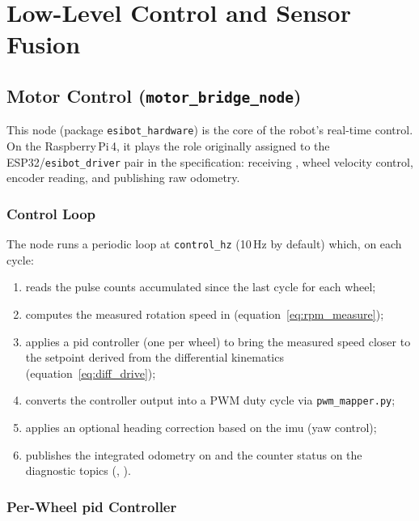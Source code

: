 \chapter{Low-Level Control and Sensor Fusion}
\label{ch:commande_bas_niveau}

\section{Motor Control (\texttt{motor\_bridge\_node})}
\label{sec:cbn_motor_bridge}

This node (package \texttt{esibot\_hardware}) is the core of the robot's real-time
control. On the Raspberry\,Pi\,4, it plays the role originally assigned to the
ESP32/\texttt{esibot\_driver} pair in the specification: receiving ,
wheel velocity control, encoder reading, and publishing raw odometry.

\subsection{Control Loop}
\label{sec:cbn_loop}

The node runs a periodic loop at \texttt{control\_hz} (10\,Hz by default) which, on each
cycle:
\begin{enumerate}
	\item reads the pulse counts accumulated since the last cycle for each wheel;
	\item computes the measured rotation speed in \unit{\rpm} (equation~\ref{eq:rpm_measure});
	\item applies a \gls{pid} controller (one per wheel) to bring the measured speed closer to
	      the setpoint derived from the differential kinematics (equation~\ref{eq:diff_drive});
	\item converts the controller output into a PWM duty cycle via \texttt{pwm\_mapper.py};
	\item applies an optional heading correction based on the \gls{imu} (yaw control);
	\item publishes the integrated odometry on  and the counter status on the
	      diagnostic topics (, ).
\end{enumerate}

\subsection{Per-Wheel \gls{pid} Controller}
\label{sec:cbn_pid}

